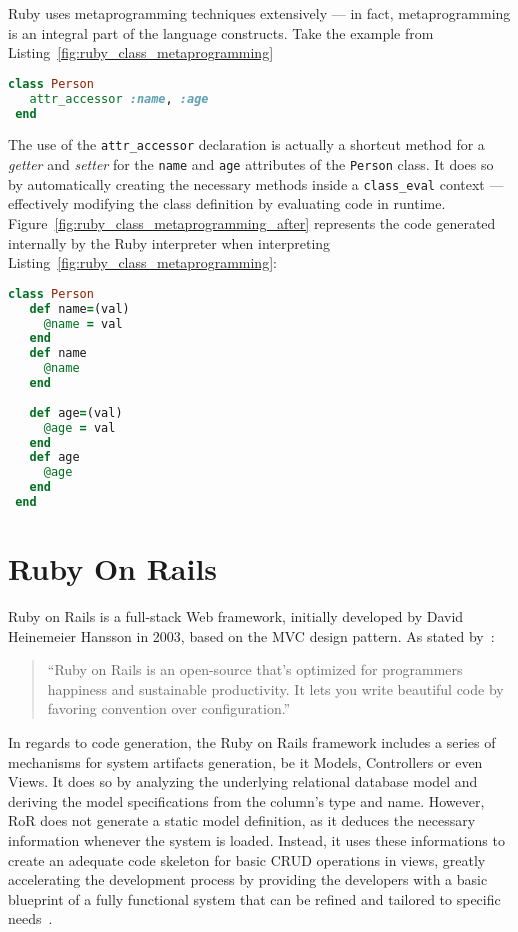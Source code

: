 Ruby uses metaprogramming techniques extensively --- in fact, metaprogramming is an integral part of the language constructs. Take the example from Listing~\ref{fig:ruby_class_metaprogramming}

\begin{lstlisting}[language=ruby, float=htb, label=fig:ruby_class_metaprogramming, caption=Metaprogramming in Ruby classes.]
 class Person
   attr_accessor :name, :age
 end
\end{lstlisting}

The use of the \verb!attr_accessor! declaration is actually a shortcut method for a \emph{getter} and \emph{setter} for the \verb!name! and \verb!age! attributes of the \verb!Person! class. It does so by automatically creating the necessary methods inside a \verb!class_eval! context --- effectively modifying the class definition by evaluating code in runtime. Figure~\ref{fig:ruby_class_metaprogramming_after} represents the code generated internally by the Ruby interpreter when interpreting Listing~\ref{fig:ruby_class_metaprogramming}:

\begin{lstlisting}[language=ruby, float=htb, label=fig:ruby_class_metaprogramming_after, caption=Code generated by Ruby metaprogramming constructs.]
 class Person
   def name=(val)
     @name = val
   end
   def name
     @name
   end
   
   def age=(val)
     @age = val
   end
   def age
     @age
   end
 end
\end{lstlisting}

\section{Ruby On Rails}\label{sec:ror}

Ruby on Rails is a full-stack Web framework, initially developed by David Heinemeier Hansson in 2003, based on the MVC design pattern. As stated by~\cite{rubyonrails}:

\begin{quote}
  ``Ruby on Rails is an open-source that's optimized for programmers happiness and sustainable productivity. It lets you write beautiful code by favoring convention over configuration.''
\end{quote}

In regards to code generation, the Ruby on Rails framework includes a series of mechanisms for system artifacts generation, be it Models, Controllers or even Views. It does so by analyzing the underlying relational database model and deriving the model specifications from the column's type and name. However, RoR does not generate a static model definition, as it deduces the necessary information whenever the system is loaded. Instead, it uses these informations to create an adequate code skeleton for basic CRUD operations in views, greatly accelerating the development process by providing the developers with a basic blueprint of a fully functional system that can be refined and tailored to specific needs~\cite{rails_generators}.

